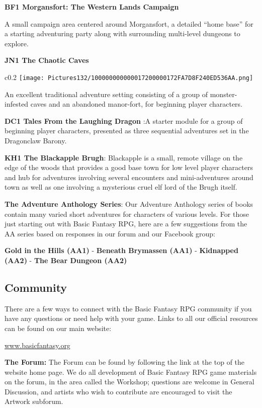 \documentclass[a4paper,twoside,openany,10pt]{book}
\begin{document}
\textbf{BF1 Morgansfort: The Western Lands Campaign}

A small campaign area centered around Morgansfort, a detailed ``home base'' for a starting adventuring party along with surrounding multi-level dungeons to explore.

\textbf{JN1 The Chaotic Caves}

\begin{wrapfigure}{c}{0.2\textwidth}
	 \texttt{[image: Pictures132/100000000000017200000172FA7D8F240ED536AA.png]}  
\end{wrapfigure}


An excellent traditional adventure setting consisting of a group of monster-infested caves and an abandoned manor-fort, for beginning player characters.

\textbf{DC1 Tales From the Laughing Dragon} :A starter module for a group of beginning player characters, presented as three sequential adventures set in the Dragonclaw Barony.

\textbf{KH1 The Blackapple Brugh}: Blackapple is a small, remote village on the edge of the woods that provides a good base town for low level player characters and hub for adventures involving several encounters and mini-adventures around town as well as one involving a mysterious cruel elf lord of the Brugh itself.

\textbf{The Adventure Anthology Series}: Our Adventure Anthology series of books contain many varied short adventures for characters of various levels. For those just starting out with Basic Fantasy RPG, here are a few suggestions from the AA series based on responses in our forum and our Facebook group:

\textbf{Gold in the Hills (AA1)} - \textbf{Beneath Brymassen (AA1)} -  \textbf{Kidnapped (AA2)} - \textbf{The Bear Dungeon (AA2)}


\subsection{Community}\label{community}

There are a few ways to connect with the Basic Fantasy RPG community if you have any questions or need help with your game. Links to all our official resources can be found on our main website:

\href{www.basicfantasy.org}{www.basicfantasy.org}

\textbf{The Forum:} The Forum can be found by following the link at the top of the website home page. We do all development of Basic Fantasy RPG game materials on the forum, in the area called the Workshop; questions are welcome in General Discussion, and artists who wish to contribute are encouraged to visit the Artwork subforum.
\end{document}
